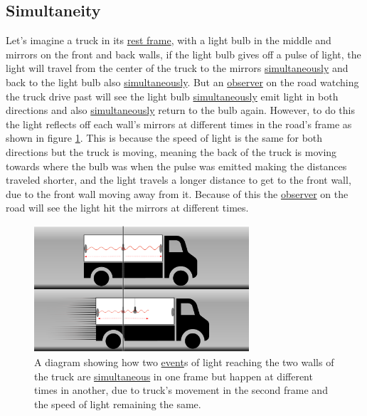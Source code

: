 \subsection{Simultaneity}

Let's imagine a truck in its \hyperlink{def-proper-frame}{rest frame}, with a light bulb in the middle and mirrors on the front and back walls, if the light bulb gives off a pulse of light, the light will travel from the center of the truck to the mirrors \hyperlink{def-simultaneity}{simultaneously} and back to the light bulb also \hyperlink{def-simultaneity}{simultaneously}. But an \hyperlink{def-observer}{observer} on the road watching the truck drive past will see the light bulb \hyperlink{def-simultaneity}{simultaneously} emit light in both directions and also \hyperlink{def-simultaneity}{simultaneously} return to the bulb again. However, to do this the light reflects off each wall's mirrors at different times in the road's frame as shown in figure \ref{fig: truck simultaneity}. This is because the speed of light is the same for both directions but the truck is moving, meaning the back of the truck is moving towards where the bulb was when the pulse was emitted making the distances traveled shorter, and the light travels a longer distance to get to the front wall, due to the front wall moving away from it. Because of this the \hyperlink{def-observer}{observer} on the road will see the light hit the mirrors at different times.

\begin{figure}[htbp]
	\centering
	\includegraphics[width=8cm]{images/pdf/lorry_simul.pdf}
	\caption{A diagram showing how two \protect\hyperlink{def-event}{event}s of light reaching the two walls of the truck are \protect\hyperlink{def-simultaneity}{simultaneous} in one frame but happen at different times in another, due to truck's movement in the second frame and the speed of light remaining the same.}
	\label{fig: truck simultaneity}
\end{figure}

